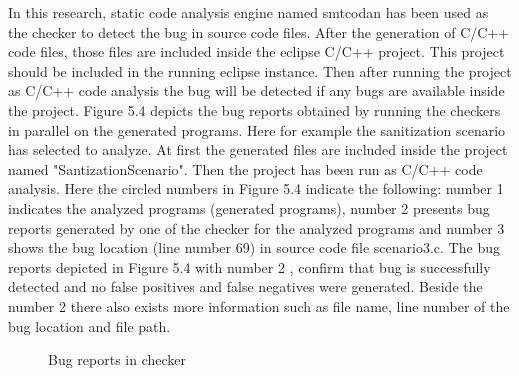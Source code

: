 In this research, static code analysis engine named smtcodan has been used as the checker to detect the bug in source code files. After the generation of C/C++ code files, those files are included inside the eclipse C/C++ project. This project should be included in the running eclipse instance. Then after running the project as C/C++ code analysis the bug will be detected if any bugs are available inside the project. Figure 5.4 depicts the bug reports obtained by running the checkers in parallel on the generated programs. Here for example the sanitization scenario has selected to analyze. At first the generated files are included inside the project named "SantizationScenario". Then the project has been run as C/C++ code analysis. Here the circled numbers in Figure 5.4 indicate the following: number 1 indicates the analyzed programs (generated programs), number
2 presents bug reports generated by one of the checker for the analyzed programs and number 3 shows the
bug location (line number 69) in source code file scenario3.c. The bug reports depicted in Figure 5.4 with number
2 , confirm that bug is successfully detected and no
false positives and false negatives were generated. Beside the number 2 there also exists more information such as file name, line number of the bug location and file path. 

\begin{figure}[htbp]
	\centering
	\label{fig:bugDetection}
	\vspace{-24em}
	\caption{Bug reports in checker}
\end{figure}

